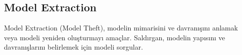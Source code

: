 \subsection{Model Extraction}
Model Extraction (Model Theft), modelin mimarisini ve davranışını anlamak veya modeli yeniden oluşturmayı amaçlar. Saldırgan, modelin yapısını ve davranışlarını belirlemek için modeli sorgular. 

\newpage